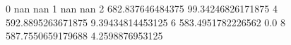 0 nan nan
1 nan nan
2 682.837646484375 99.34246826171875
4 592.8895263671875 9.39434814453125
6 583.4951782226562 0.0
8 587.7550659179688 4.2598876953125
